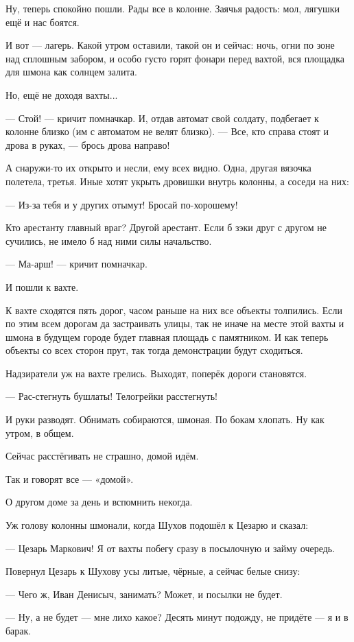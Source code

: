 Ну, теперь спокойно пошли. Рады все в колонне. Заячья радость: мол, лягушки ещё и нас боятся.

И вот --- лагерь. Какой утром оставили, такой он и сейчас: ночь, огни по зоне над сплошным
забором, и особо густо горят фонари перед вахтой, вся площадка для шмона как солнцем залита.

Но, ещё не доходя вахты...

--- Стой! --- кричит помначкар. И, отдав автомат свой солдату, подбегает к колонне близко (им с
автоматом не велят близко). --- Все, кто справа стоят и дрова в руках, --- брось дрова направо!

А снаружи-то их открыто и несли, ему всех видно. Одна, другая вязочка полетела, третья. Иные
хотят укрыть дровишки внутрь колонны, а соседи на них:

--- Из-за тебя и у других отымут! Бросай по-хорошему!

Кто арестанту главный враг? Другой арестант. Если б зэки друг с другом не сучились, не имело б
над ними силы начальство.

--- Ма-арш! --- кричит помначкар.

И пошли к вахте.

К вахте сходятся пять дорог, часом раньше на них все объекты толпились. Если по этим всем
дорогам да застраивать улицы, так не иначе на месте этой вахты и шмона в будущем городе будет
главная площадь с памятником. И как теперь объекты со всех сторон прут, так тогда
демонстрации будут сходиться.

Надзиратели уж на вахте грелись. Выходят, поперёк дороги становятся.

--- Рас-стегнуть бушлаты! Телогрейки расстегнуть!

И руки разводят. Обнимать собираются, шмоная. По бокам хлопать. Ну как утром, в общем.

Сейчас расстёгивать не страшно, домой идём.

Так и говорят все --- «домой».

О другом доме за день и вспомнить некогда.

Уж голову колонны шмонали, когда Шухов подошёл к Цезарю и сказал:

--- Цезарь Маркович! Я от вахты побегу сразу в посылочную и займу очередь.

Повернул Цезарь к Шухову усы литые, чёрные, а сейчас белые снизу:

--- Чего ж, Иван Денисыч, занимать? Может, и посылки не будет.

--- Ну, а не будет --- мне лихо какое? Десять минут подожду, не придёте --- я и в барак.

